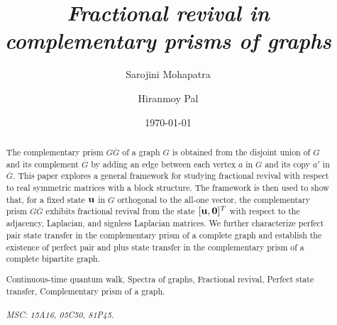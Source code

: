 \documentclass[12pt,a4paper]{article}
\title{\it Fractional revival in complementary prisms of graphs}
\author[1]{Sarojini Mohapatra}
\author[2]{Hiranmoy Pal}
\affil[1,2]{National Institute of Technology Rourkela, India-769008 palh@nitrkl.ac.in}
\date{\today}
\def \u {{\bf u}}
\begin{document}
	
	\maketitle
	
	
	
		\begin{abstract}
        The complementary prism $G\overline{G}$ of a graph $G$ is obtained from the disjoint union of $G$ and its complement $\overline{G}$ by adding an edge between each vertex $a$ in $G$ and its copy $a'$ in $\overline{G}.$ This paper explores a general framework for studying fractional revival with respect to real symmetric matrices with a block structure. The framework is then used to show that, for a fixed state $\u$ in $G$ orthogonal to the all-one vector, the complementary prism $G\overline{G}$ exhibits fractional revival from the state $[\u,\mathbf{0}]^T$ with respect to the adjacency, Laplacian, and signless Laplacian matrices. We further characterize perfect pair state transfer in the complementary prism of a complete graph and establish the existence of perfect pair and plus state transfer in the complementary prism of a complete bipartite graph. 

\vspace{0.5cm}      
     Continuous-time quantum walk,  Spectra of graphs, Fractional revival, Perfect state transfer, Complementary prism of a graph. \\\\
    {\it MSC: 15A16, 05C50, 81P45.}
	\end{abstract}
	
	
	\newpage
\end{document}
